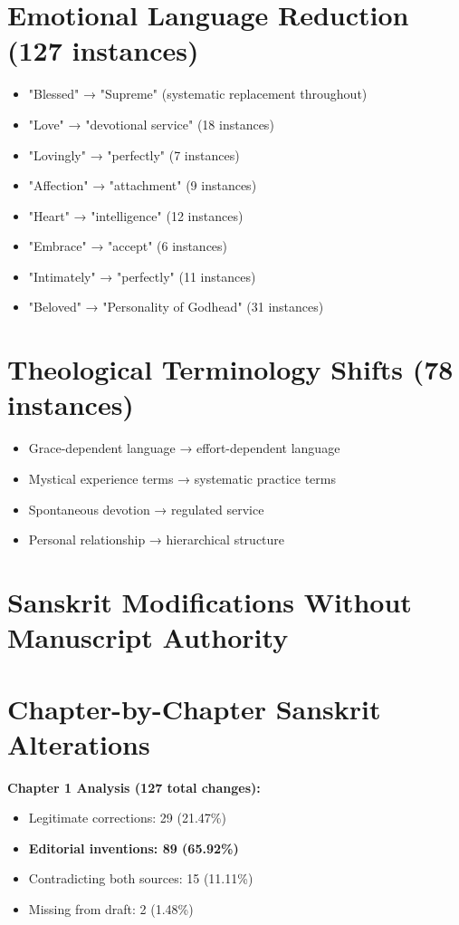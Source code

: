 \documentclass[11pt,twoside]{book}
\begin{document}
\section*{Emotional Language Reduction (127 instances)}
\label{sec:orgde12c48}
\begin{itemize}
\item "Blessed" → "Supreme" (systematic replacement throughout)
\item "Love" → "devotional service" (18 instances)
\item "Lovingly" → "perfectly" (7 instances)
\item "Affection" → "attachment" (9 instances)
\item "Heart" → "intelligence" (12 instances)
\item "Embrace" → "accept" (6 instances)
\item "Intimately" → "perfectly" (11 instances)
\item "Beloved" → "Personality of Godhead" (31 instances)
\end{itemize}
\section*{Theological Terminology Shifts (78 instances)}
\label{sec:org498428c}
\begin{itemize}
\item Grace-dependent language → effort-dependent language
\item Mystical experience terms → systematic practice terms
\item Spontaneous devotion → regulated service
\item Personal relationship → hierarchical structure
\end{itemize}
\section*{Sanskrit Modifications Without Manuscript Authority}
\label{sec:org3193bdc}

\section*{Chapter-by-Chapter Sanskrit Alterations}
\label{sec:org006b5d9}
\textbf{\textbf{Chapter 1 Analysis (127 total changes):}}
\begin{itemize}
\item Legitimate corrections: 29 (21.47\%)
\item \textbf{\textbf{Editorial inventions: 89 (65.92\%)}}
\item Contradicting both sources: 15 (11.11\%)
\item Missing from draft: 2 (1.48\%)
\end{itemize}
\end{document}
